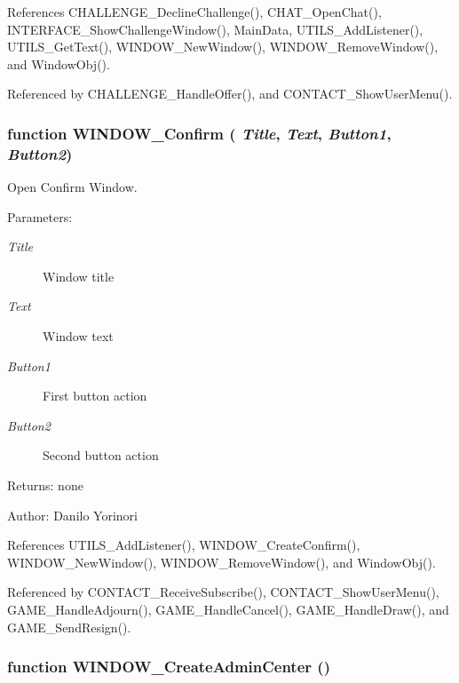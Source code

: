 References CHALLENGE\_\-DeclineChallenge(), CHAT\_\-OpenChat(), INTERFACE\_\-ShowChallengeWindow(), MainData, UTILS\_\-AddListener(), UTILS\_\-GetText(), WINDOW\_\-NewWindow(), WINDOW\_\-RemoveWindow(), and WindowObj().

Referenced by CHALLENGE\_\-HandleOffer(), and CONTACT\_\-ShowUserMenu().
\subsubsection[WINDOW\_\-Confirm]{\setlength{\rightskip}{0pt plus 5cm}function WINDOW\_\-Confirm ( {\em Title}, \/   {\em Text}, \/   {\em Button1}, \/   {\em Button2})}\label{window_2window_8js_cf8bd95031baaa8a5b88de2cc0848015}


Open Confirm Window. 

\begin{Desc}
\item[Parameters:]
\begin{description}
\item[{\em Title}]Window title \item[{\em Text}]Window text \item[{\em Button1}]First button action \item[{\em Button2}]Second button action \end{description}
\end{Desc}
\begin{Desc}
\item[Returns:]none \end{Desc}
\begin{Desc}
\item[Author:]Danilo Yorinori \end{Desc}


References UTILS\_\-AddListener(), WINDOW\_\-CreateConfirm(), WINDOW\_\-NewWindow(), WINDOW\_\-RemoveWindow(), and WindowObj().

Referenced by CONTACT\_\-ReceiveSubscribe(), CONTACT\_\-ShowUserMenu(), GAME\_\-HandleAdjourn(), GAME\_\-HandleCancel(), GAME\_\-HandleDraw(), and GAME\_\-SendResign().
\subsubsection[WINDOW\_\-CreateAdminCenter]{\setlength{\rightskip}{0pt plus 5cm}function WINDOW\_\-CreateAdminCenter ()}\label{window_2window_8js_77cb1b7471fa60b6d0223a1597fe8d24}





